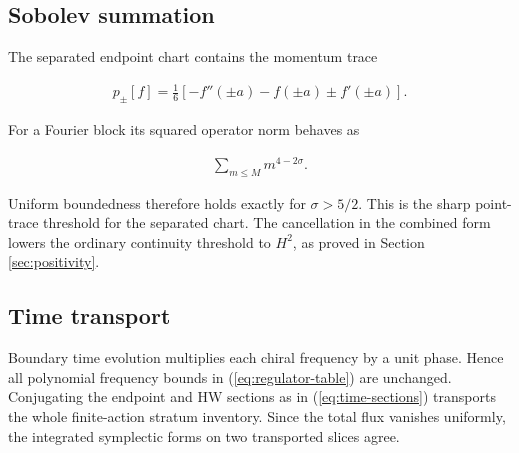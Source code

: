\subsection{Sobolev summation}

The separated endpoint chart contains the momentum trace

\begin{align}
p_\pm[f]
=\frac16\left[-f''(\pm a)-f(\pm a)\pm f'(\pm a)\right].
\end{align}

For a Fourier block its squared operator norm behaves as

\begin{align}
\sum_{m\leq M}m^{4-2\sigma}.
\end{align}

Uniform boundedness therefore holds exactly for $\sigma>5/2$. This is the sharp point-trace threshold for the separated chart. The cancellation in the combined form lowers the ordinary continuity threshold to $H^2$, as proved in Section \ref{sec:positivity}.

\subsection{Time transport}

Boundary time evolution multiplies each chiral frequency by a unit phase. Hence all polynomial frequency bounds in (\ref{eq:regulator-table}) are unchanged. Conjugating the endpoint and HW sections as in (\ref{eq:time-sections}) transports the whole finite-action stratum inventory. Since the total flux vanishes uniformly, the integrated symplectic forms on two transported slices agree.
